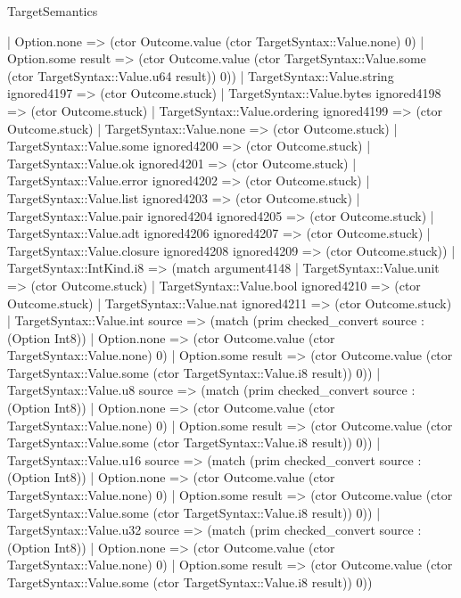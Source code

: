 \begin{lexlean}{TargetSemantics}
\begin{semanticmodule}
{              | Option.none => (ctor Outcome.value (ctor TargetSyntax::Value.none) 0)
              | Option.some result => (ctor Outcome.value (ctor TargetSyntax::Value.some (ctor TargetSyntax::Value.u64 result)) 0))
            | TargetSyntax::Value.string ignored4197 => (ctor Outcome.stuck)
            | TargetSyntax::Value.bytes ignored4198 => (ctor Outcome.stuck)
            | TargetSyntax::Value.ordering ignored4199 => (ctor Outcome.stuck)
            | TargetSyntax::Value.none => (ctor Outcome.stuck)
            | TargetSyntax::Value.some ignored4200 => (ctor Outcome.stuck)
            | TargetSyntax::Value.ok ignored4201 => (ctor Outcome.stuck)
            | TargetSyntax::Value.error ignored4202 => (ctor Outcome.stuck)
            | TargetSyntax::Value.list ignored4203 => (ctor Outcome.stuck)
            | TargetSyntax::Value.pair ignored4204 ignored4205 => (ctor Outcome.stuck)
            | TargetSyntax::Value.adt ignored4206 ignored4207 => (ctor Outcome.stuck)
            | TargetSyntax::Value.closure ignored4208 ignored4209 => (ctor Outcome.stuck))
          | TargetSyntax::IntKind.i8 => (match argument4148
            | TargetSyntax::Value.unit => (ctor Outcome.stuck)
            | TargetSyntax::Value.bool ignored4210 => (ctor Outcome.stuck)
            | TargetSyntax::Value.nat ignored4211 => (ctor Outcome.stuck)
            | TargetSyntax::Value.int source => (match (prim checked_convert source : (Option Int8))
              | Option.none => (ctor Outcome.value (ctor TargetSyntax::Value.none) 0)
              | Option.some result => (ctor Outcome.value (ctor TargetSyntax::Value.some (ctor TargetSyntax::Value.i8 result)) 0))
            | TargetSyntax::Value.u8 source => (match (prim checked_convert source : (Option Int8))
              | Option.none => (ctor Outcome.value (ctor TargetSyntax::Value.none) 0)
              | Option.some result => (ctor Outcome.value (ctor TargetSyntax::Value.some (ctor TargetSyntax::Value.i8 result)) 0))
            | TargetSyntax::Value.u16 source => (match (prim checked_convert source : (Option Int8))
              | Option.none => (ctor Outcome.value (ctor TargetSyntax::Value.none) 0)
              | Option.some result => (ctor Outcome.value (ctor TargetSyntax::Value.some (ctor TargetSyntax::Value.i8 result)) 0))
            | TargetSyntax::Value.u32 source => (match (prim checked_convert source : (Option Int8))
              | Option.none => (ctor Outcome.value (ctor TargetSyntax::Value.none) 0)
              | Option.some result => (ctor Outcome.value (ctor TargetSyntax::Value.some (ctor TargetSyntax::Value.i8 result)) 0))
}
\end{semanticmodule}
\end{lexlean}
